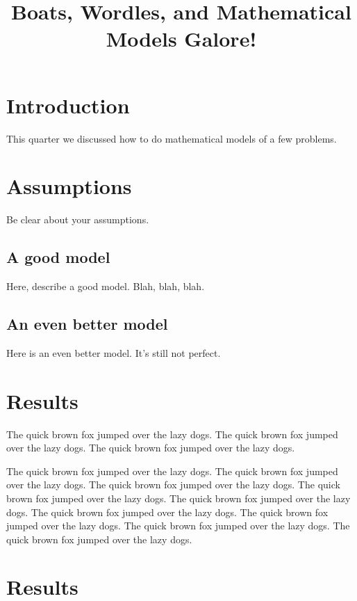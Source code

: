 \documentclass[12pt]{article}
\begin{document}
\title{Boats, Wordles, and Mathematical Models Galore!}
\maketitle


\section{Introduction}

This quarter we discussed how to do mathematical models of 
a few problems. 

\section{Assumptions}

Be clear about your assumptions.  

\subsection{A good model}

Here, describe a good model. Blah, blah, blah.

\subsection{An even better model}

Here is an even better model. It's still not perfect. 

\section{Results}

The quick brown fox jumped over the lazy dogs. 
The quick brown fox jumped over the lazy dogs. 
The quick brown fox jumped over the lazy dogs. 

\newpage

The quick brown fox jumped over the lazy dogs. 
The quick brown fox jumped over the lazy dogs. 
The quick brown fox jumped over the lazy dogs. 
The quick brown fox jumped over the lazy dogs. 
The quick brown fox jumped over the lazy dogs. 
The quick brown fox jumped over the lazy dogs. 
The quick brown fox jumped over the lazy dogs. 
The quick brown fox jumped over the lazy dogs. 
The quick brown fox jumped over the lazy dogs. 

\newpage

\section{Results}
\end{document}
